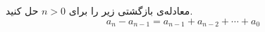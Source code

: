 \EXERCISE
معادله‌ی بازگشتی زیر را برای
$n > 0$
حل کنید.
$$a_n - a_{n-1} = a_{n-1} + a_{n-2} + \cdots + a_0$$